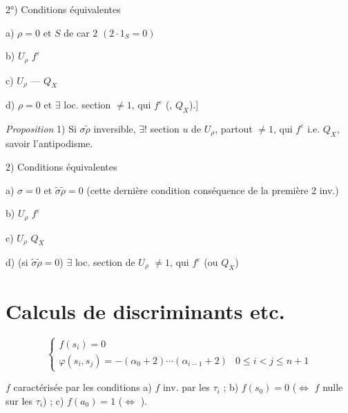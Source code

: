\documentclass[11pt,a4paper]{article}
\begin{document}
2°) Conditions équivalentes

a) $\rho = 0$ et  $S$ de car $2$ $(2 \cdot 1_S = 0)$

b) $U_\rho$  $f^{\varepsilon}$

c) $U_\rho$ --- $Q_X$

d) $\rho = 0$ et $\exists$ loc. section  $\neq 1$, qui
 $f^{\varepsilon}$ (, $Q_X$).]

\emph{Proposition} 1) Si $\sigma\tilde{\rho}$ inversible, $\exists !$ section
$u$ de $U_\rho$, partout $\neq 1$, qui  $f^{\varepsilon}$
i.e. $Q_X$, savoir l'antipodisme.

2) Conditions équivalentes

a) $\sigma = 0$ et $\tilde{\sigma}\tilde{\rho} = 0$ (cette dernière condition
conséquence de la première \ill{} \ill{} 2 inv.)

b) $U_\rho$  $f^{\varepsilon}$

c) $U_\rho$  $Q_X$

d) (si $\tilde{\sigma}\tilde{\rho} = 0$) $\exists$ loc. section de $U_\rho$
 $\neq 1$, qui  $f^{\varepsilon}$
(ou $Q_X$)

\section*{Calculs de discriminants etc.}

\[
\begin{cases}
f(s_i) = 0 \\
\varphi(s_i, s_j) = -(\alpha_0 + 2) \cdots (\alpha_{i-1} + 2) & 0 \leqslant i < j \leqslant n+1
\end{cases}
\]

$f$ caractérisée par les conditions a) $f$ inv. par les $\tau_i$ ;
b) $f(s_0) = 0$ ($\Leftrightarrow$ $f$ nulle sur les   $\tau_i$) ; c) $f(a_0) = 1$ ($\Leftrightarrow$
\struck{\ill{}}   ).
\end{document}
